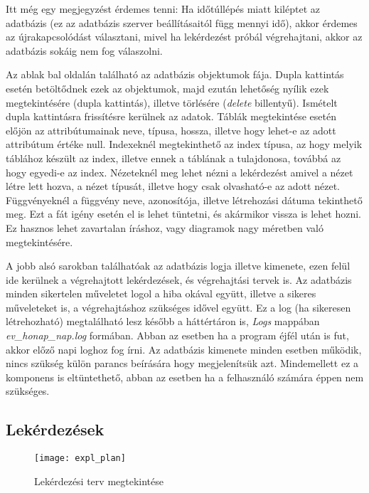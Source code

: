 Itt még egy megjegyzést érdemes tenni: Ha időtúllépés miatt kiléptet az adatbázis (ez az adatbázis szerver beállításaitól függ mennyi idő), akkor
érdemes az újrakapcsolódást választani, mivel ha lekérdezést próbál végrehajtani, akkor az adatbázis sokáig nem fog válaszolni.

Az ablak bal oldalán található az adatbázis objektumok fája. Dupla kattintás esetén betöltődnek ezek az objektumok, majd ezután lehetőség nyílik ezek megtekintésére
(dupla kattintás), illetve törlésére (\textit{delete} billentyű). Ismételt dupla kattintásra frissítésre kerülnek az adatok. Táblák megtekintése esetén előjön az
attribútumainak neve, típusa, hossza, illetve hogy lehet-e az adott attribútum értéke null. Indexeknél megtekinthető az index típusa, az hogy melyik táblához készült az index, illetve
ennek a táblának a tulajdonosa, továbbá az hogy egyedi-e az index. Nézeteknél meg lehet nézni a lekérdezést amivel a nézet létre lett hozva, a nézet típusát, illetve
hogy csak olvasható-e az adott nézet. Függvényeknél a függvény neve, azonosítója, illetve létrehozási dátuma tekinthető meg. Ezt a fát igény esetén el is lehet tüntetni,
és akármikor vissza is lehet hozni. Ez hasznos lehet zavartalan íráshoz, vagy diagramok nagy méretben való megtekintésére.

A jobb alsó sarokban találhatóak az adatbázis logja illetve kimenete, ezen felül ide kerülnek a végrehajtott lekérdezések, és végrehajtási tervek is. Az adatbázis minden
sikertelen műveletet logol a hiba okával együtt, illetve a sikeres műveleteket is, a végrehajtáshoz szükséges idővel együtt. Ez a log (ha sikeresen létrehozható) megtalálható
lesz később a háttértáron is, \textit{Logs} mappában \textit{ev\_honap\_nap.log} formában. Abban az esetben ha a program éjfél után is fut, akkor előző napi loghoz fog írni. Az adatbázis
kimenete minden esetben működik, nincs szükség külön parancs beírására hogy megjelenítsük azt. Mindemellett ez a komponens is eltüntethető, abban az esetben ha a felhasználó számára éppen nem
szükséges.
\newpage

\subsection{Lekérdezések}

\begin{figure}[ht]
  \begin{center}
  \texttt{[image: expl\_plan]}
  \end{center}
 \caption{Lekérdezési terv megtekintése}
\end{figure}


